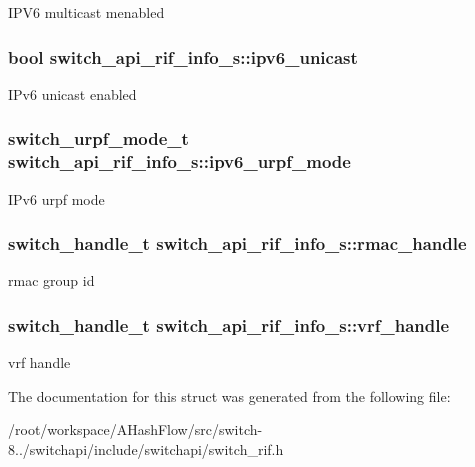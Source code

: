 I\+P\+V6 multicast menabled \hypertarget{structswitch__api__rif__info__s_a23aa90832894a05c4ef776a33a0c3dc0}{
\subsubsection[{ipv6\+\_\+unicast}]{\setlength{\rightskip}{0pt plus 5cm}bool switch\+\_\+api\+\_\+rif\+\_\+info\+\_\+s\+::ipv6\+\_\+unicast}}\label{structswitch__api__rif__info__s_a23aa90832894a05c4ef776a33a0c3dc0}
I\+Pv6 unicast enabled \hypertarget{structswitch__api__rif__info__s_adc016d206c51c49ba0089401c4678727}{
\subsubsection[{ipv6\+\_\+urpf\+\_\+mode}]{\setlength{\rightskip}{0pt plus 5cm}switch\+\_\+urpf\+\_\+mode\+\_\+t switch\+\_\+api\+\_\+rif\+\_\+info\+\_\+s\+::ipv6\+\_\+urpf\+\_\+mode}}\label{structswitch__api__rif__info__s_adc016d206c51c49ba0089401c4678727}
I\+Pv6 urpf mode \hypertarget{structswitch__api__rif__info__s_a25e7088aadc374b61fa3e76b470fff54}{
\subsubsection[{rmac\+\_\+handle}]{\setlength{\rightskip}{0pt plus 5cm}switch\+\_\+handle\+\_\+t switch\+\_\+api\+\_\+rif\+\_\+info\+\_\+s\+::rmac\+\_\+handle}}\label{structswitch__api__rif__info__s_a25e7088aadc374b61fa3e76b470fff54}
rmac group id \hypertarget{structswitch__api__rif__info__s_a5a6e162884b7611e07c888702d1b4aee}{
\subsubsection[{vrf\+\_\+handle}]{\setlength{\rightskip}{0pt plus 5cm}switch\+\_\+handle\+\_\+t switch\+\_\+api\+\_\+rif\+\_\+info\+\_\+s\+::vrf\+\_\+handle}}\label{structswitch__api__rif__info__s_a5a6e162884b7611e07c888702d1b4aee}
vrf handle 

The documentation for this struct was generated from the following file\+:\begin{DoxyCompactItemize}
\item 
/root/workspace/\+A\+Hash\+Flow/src/switch-\/8../switchapi/include/switchapi/switch\+\_\+rif.\+h\end{DoxyCompactItemize}
